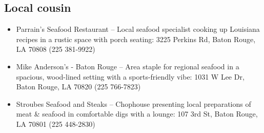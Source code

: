 \documentclass[12pt]{book}
\begin{document}
\subsection*{Local cousin}

\begin{itemize}
\item Parrain's Seafood Restaurant -- Local seafood specialist cooking up Louisiana recipes in a rustic space with porch seating: 3225 Perkins Rd, Baton Rouge, LA 70808 (225 381-9922)
\item Mike Anderson's - Baton Rouge -- Area staple for regional seafood in a spacious, wood-lined setting with a sports-friendly vibe: 1031 W Lee Dr, Baton Rouge, LA 70820 (225 766-7823)
\item Stroubes Seafood and Steaks -- Chophouse presenting local preparations of meat \& seafood in comfortable digs with a lounge: 107 3rd St, Baton Rouge, LA 70801 (225 448-2830)
\end{itemize}


\backmatter
\renewcommand{\indexname}{Author Index}
\printindex
\end{document}
